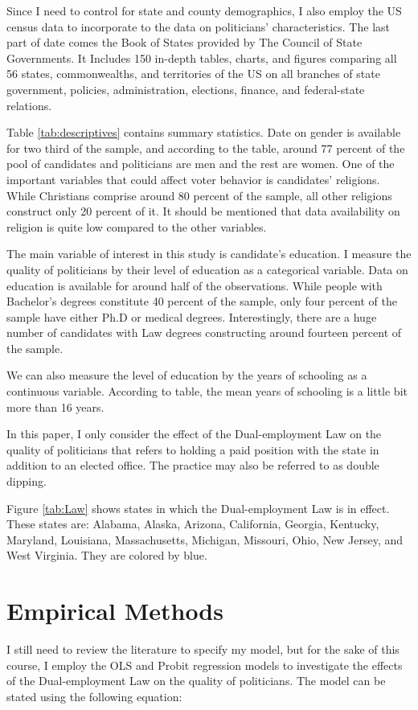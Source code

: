 \documentclass[12pt,english]{article}
\begin{document}
Since I need to control for state and county demographics, I also employ the US census data to incorporate to the data on politicians' characteristics. The last part of date comes the Book of States provided by The Council of State Governments. It Includes 150 in-depth tables, charts, and figures comparing all 56 states, commonwealths, and territories of the US on all branches of state government, policies, administration, elections, finance, and federal-state relations.

Table \ref{tab:descriptives} contains summary statistics. Date on gender is available for two third of the sample, and according to the table, around 77 percent of the pool of candidates and politicians are men and the rest are women. One of the important variables that could affect voter behavior is candidates' religions. While Christians comprise around 80 percent of the sample, all other religions  construct only 20 percent of it. It should be mentioned that data availability on religion is quite low compared to the other variables.  

The main variable of interest in this study is candidate's education. I measure the quality of politicians by their level of education as a categorical variable. Data on education is available for around half of the observations. While people with Bachelor's degrees constitute 40 percent of the sample, only four percent of the sample have either Ph.D or medical degrees. Interestingly, there are a huge number of candidates with Law degrees constructing around fourteen percent of the sample.

We can also measure the level of education by the years of schooling as a continuous variable. According to table, the mean years of schooling is a little bit more than 16 years.

In this paper, I only consider the effect of the Dual-employment Law on the quality of politicians that refers to holding a paid position with the state in addition to an elected office. The practice may also be referred to as double dipping.

Figure \ref{tab:Law} shows states in which the Dual-employment Law is in effect. These states are: Alabama, Alaska, Arizona, California, Georgia, Kentucky, Maryland, Louisiana, Massachusetts, Michigan, Missouri, Ohio, New Jersey, and West Virginia. They are colored by blue.



\section{Empirical Methods}\label{sec:methods}
I still need to review the literature to specify my model, but for the sake of this course, I  employ the OLS and Probit regression models to investigate the effects of the Dual-employment Law on the quality of politicians. The model can be stated using the following equation:
\end{document}
